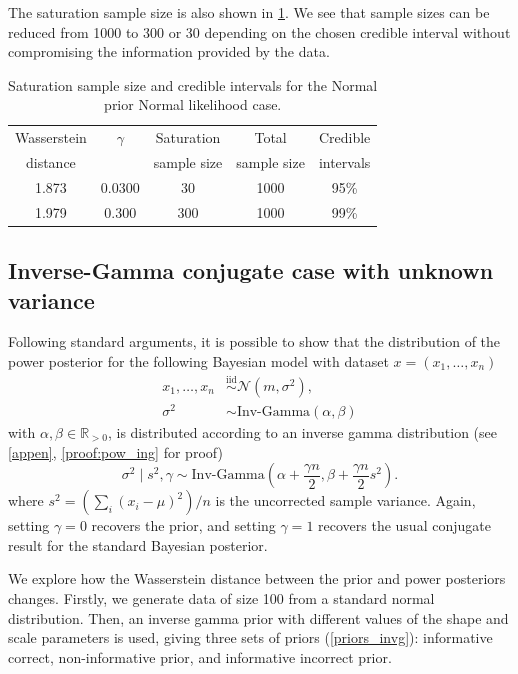 \documentclass[12pt]{article}
\begin{document}
The saturation sample size is also shown in \cref{tab:satsize}. We see that sample sizes can be reduced from 1000 to 300 or 30 depending on the chosen credible interval without compromising the information provided by the data.

\begin{table}[h]
	\caption{Saturation sample size and credible intervals for the Normal prior Normal likelihood case.}
	\renewcommand{\arraystretch}{1.5}
	\centering
		\begin{tabular}{ccccc} 
			\hline
			Wasserstein & $\gamma$ & Saturation & Total & Credible\\
			distance& &sample size& sample size& intervals\\ [0.5ex] 
			\hline 
			1.873 & 0.0300 & 30 & 1000 & 95\%\\
			1.979 & 0.300 & 300 & 1000 & 99\% \\
			\hline
		\end{tabular}
	\label{tab:satsize}
\end{table}
\FloatBarrier
\subsection{Inverse-Gamma conjugate case with unknown variance}
Following standard arguments, it is possible to show that the distribution of
the power posterior for the following Bayesian model with dataset $x = (x_1,
\ldots, x_n)$
\begin{subequations}
\begin{align}
x_1, \ldots, x_n &\overset{\mathrm{iid}}{\sim} \mathcal{N}(m, \sigma^2), \\
\sigma^2 &\sim \text{Inv-Gamma}(\alpha, \beta)
\end{align}
\end{subequations}
with $\alpha, \beta \in \mathbb{R}_{>0}$, is distributed according to an
inverse gamma distribution (see \cref{appen}, \cref{proof:pow_ing} for proof)
\begin{equation*}
\sigma^2 \; | \; s^2, \gamma \sim \text{Inv-Gamma}\left( \alpha + \frac{\gamma n}{2}, \beta + \frac{\gamma n}{2} s^2 \right). 
\end{equation*}
where $s^2 = (\sum_{i} \left( x_i - \mu \right)^2)/n$ is the uncorrected sample
variance. Again, setting $\gamma = 0$ recovers the prior, and setting $\gamma =
1$ recovers the usual conjugate result for the standard Bayesian posterior.

We explore how the Wasserstein distance between the prior and power posteriors changes. Firstly, we generate data of size 100 from a standard normal distribution. Then, an inverse gamma prior with different values of the shape and scale parameters is used, giving three sets of priors (\cref{priors_invg}): informative correct, non-informative prior, and informative incorrect prior.
\end{document}
